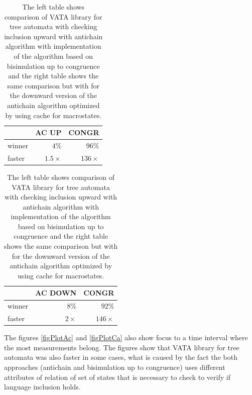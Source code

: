\begin{table}
\begin{center}
\parbox{.45\linewidth}{
  \begin{tabular}[scale=0.3]{ | l | r | r |}
   \hline
    & \textbf{AC UP} & \textbf{CONGR} \\ \hline \hline
    winner & $4\%$ & $96\%$ \\ \hline
    faster & $1.5\times$ & $136\times$ \\ \hline
   \end{tabular}
}
   \parbox{.45\linewidth}{
  \begin{tabular}{ | l | r | r |}
   \hline
    & \textbf{AC DOWN} & \textbf{CONGR} \\ \hline \hline
    winner & $8\%$ & $92\%$ \\ \hline
    faster & $2\times$ & $146\times$ \\ \hline
   \end{tabular}
   }
   \caption{The left table shows comparison of VATA library for tree automata with checking inclusion upward with antichain algorithm with
       implementation of the algorithm based on bisimulation up to congruence and
   the right table shows the same comparison but with for the downward version of the antichain algorithm optimized by using cache for macrostates.}
   \label{tabAc}
\end{center}
\end{table}

The figures \ref{figPlotAc} and \ref{figPlotCa} also show
focus to a time interval where the most measurements belong. The figures show that VATA library for tree automata was
also faster in some cases, what is caused by the fact the both approaches (antichain and bisimulation up to congruence) uses different attributes of relation
of set of states that is necessary to check to verify if language inclusion holds.

